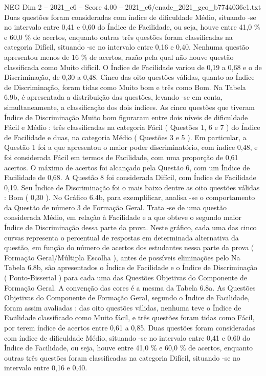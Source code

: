 \begin{textsample}{NEG Dim 2 – 2021\_c6 – Score 4.00 – 2021\_c6/enade\_2021\_geo\_b7744036e1.txt}
Duas questões foram consideradas com índice de dificuldade Médio, situando -se no intervalo entre 0,41 e 0,60 do Índice de Facilidade, ou seja, houve entre 41,0 \% e 60,0 \% de acertos, enquanto outras três questões foram classificadas na categoria Difícil, situando -se no intervalo entre 0,16 e 0,40.
Nenhuma questão apresentou menos de 16 \% de acertos, razão pela qual não houve questão classificada como Muito difícil.
O Índice de Facilidade variou de 0,19 a 0,68 e o de Discriminação, de 0,30 a 0,48.
Cinco das oito questões válidas, quanto ao Índice de Discriminação, foram tidas como Muito bom e três como Bom.
Na Tabela 6.9b, é apresentada a distribuição das questões, levando -se em conta, simultaneamente, a classificação dos dois índices.
As cinco questões que tiveram Índice de Discriminação Muito bom figuraram entre dois níveis de dificuldade Fácil e Médio : três classificadas na categoria Fácil ( Questões 1, 6 e 7 ) do Índice de Facilidade e duas, na categoria Médio ( Questões 3 e 5 ).
Em particular, a Questão 1 foi a que apresentou o maior poder discriminatório, com índice 0,48, e foi considerada Fácil em termos de Facilidade, com uma proporção de 0,61 acertos.
O máximo de acertos foi alcançado pela Questão 6, com um Índice de Facilidade de 0,68.
A Questão 8 foi considerada Difícil, com Índice de Facilidade 0,19.
Seu Índice de Discriminação foi o mais baixo dentre as oito questões válidas : Bom ( 0,30 ).
No Gráfico 6.4b, para exemplificar, analisa -se o comportamento da Questão de número 3 de Formação Geral.
Trata -se de uma questão considerada Médio, em relação à Facilidade e a que obteve o segundo maior Índice de Discriminação dessa parte da prova.
Neste gráfico, cada uma das cinco curvas representa o percentual de respostas em determinada alternativa da questão, em função do número de acertos dos estudantes nessa parte da prova ( Formação Geral/Múltipla Escolha ), antes de possíveis eliminações pelo Na Tabela 6.8b, são apresentados o Índice de Facilidade e o Índice de Discriminação ( Ponto-Bisserial ) para cada uma das Questões Objetivas do Componente de Formação Geral.
A convenção das cores é a mesma da Tabela 6.8a.
As Questões Objetivas do Componente de Formação Geral, segundo o Índice de Facilidade, foram assim avaliadas : das oito questões válidas, nenhuma teve o Índice de Facilidade classificado como Muito fácil, e três questões foram tidas como Fácil, por terem índice de acertos entre 0,61 a 0,85.
Duas questões foram consideradas com índice de dificuldade Médio, situando -se no intervalo entre 0,41 e 0,60 do Índice de Facilidade, ou seja, houve entre 41,0 \% e 60,0 \% de acertos, enquanto outras três questões foram classificadas na categoria Difícil, situando -se no intervalo entre 0,16 e 0,40.

\end{textsample}

